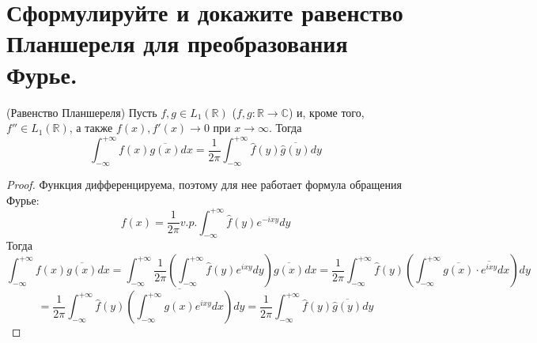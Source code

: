 \section{Сформулируйте и докажите равенство Планшереля для преобразования Фурье.}
\begin{theorem} (Равенство Планшереля)
    Пусть $f, g\in L_1(\mathbb{R})$ ($f, g\colon \mathbb{R}\to\mathbb{C}$) и, кроме того, $f'' \in L_1(\mathbb{R})$, а также $f(x), f'(x)\to 0$ при $x\to\infty$. Тогда
    $$
    \int_{-\infty}^{+\infty}f(x)\overline{g(x)}dx = \frac{1}{2\pi}\int_{-\infty}^{+\infty}\hat{f}(y)\overline{\hat{g}(y)}dy
    $$
\end{theorem}

\begin{proof}
    Функция дифференцируема, поэтому для нее работает формула обращения Фурье:
    $$
    f(x) = \frac{1}{2\pi} v.p.\int_{-\infty}^{+\infty}\hat{f}(y)e^{-ixy}dy
    $$
    Тогда
    $$
    \int_{-\infty}^{+\infty}f(x)\overline{g(x)}dx = \int_{-\infty}^{+\infty}\frac{1}{2\pi}\left(\int_{-\infty}^{+\infty}\hat{f}(y)e^{ixy}dy\right)\overline{g(x)}dx
    =
    \frac{1}{2\pi}\int_{-\infty}^{+\infty}\hat{f}(y)\left(\int_{-\infty}^{+\infty}\overline{g(x)}\cdot \overline{e^{ixy}}dx\right)dy
    $$
    $$
    =
    \frac{1}{2\pi}\int_{-\infty}^{+\infty}\hat{f}(y)\overline{\left(\int_{-\infty}^{+\infty}g(x)e^{ixy}dx\right)}dy = \frac{1}{2\pi}\int_{-\infty}^{+\infty}\hat{f}(y)\overline{\hat{g}(y)}dy
    $$
\end{proof}

